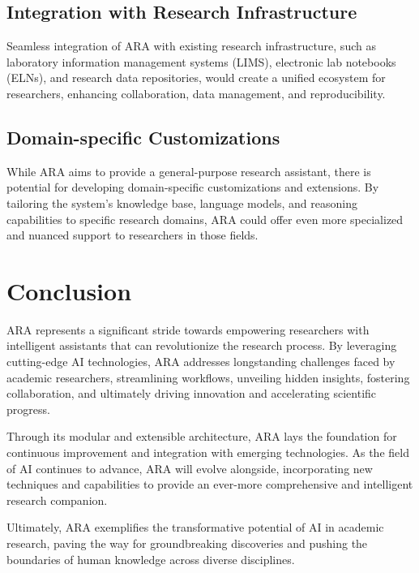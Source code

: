 \documentclass[a4paper,conference]{IEEEtran}
\begin{document}
\subsection{Integration with Research Infrastructure}
Seamless integration of ARA with existing research infrastructure, such as laboratory information management systems (LIMS), electronic lab notebooks (ELNs), and research data repositories, would create a unified ecosystem for researchers, enhancing collaboration, data management, and reproducibility.

\subsection{Domain-specific Customizations}
While ARA aims to provide a general-purpose research assistant, there is potential for developing domain-specific customizations and extensions. By tailoring the system's knowledge base, language models, and reasoning capabilities to specific research domains, ARA could offer even more specialized and nuanced support to researchers in those fields.

\section{Conclusion}
ARA represents a significant stride towards empowering researchers with intelligent assistants that can revolutionize the research process. By leveraging cutting-edge AI technologies, ARA addresses longstanding challenges faced by academic researchers, streamlining workflows, unveiling hidden insights, fostering collaboration, and ultimately driving innovation and accelerating scientific progress.

Through its modular and extensible architecture, ARA lays the foundation for continuous improvement and integration with emerging technologies. As the field of AI continues to advance, ARA will evolve alongside, incorporating new techniques and capabilities to provide an ever-more comprehensive and intelligent research companion.

Ultimately, ARA exemplifies the transformative potential of AI in academic research, paving the way for groundbreaking discoveries and pushing the boundaries of human knowledge across diverse disciplines.
\end{document}

